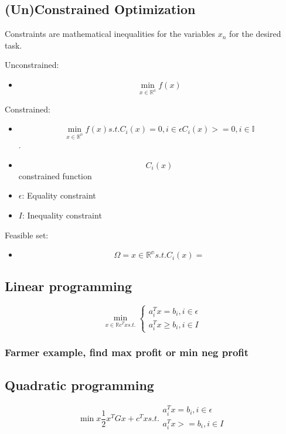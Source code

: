 \subsection{(Un)Constrained Optimization}

Constraints are mathematical inequalities for the variables $x_n$ for the desired task.

Unconstrained:
\begin{itemize}
    \item \[\min_{x \in \mathbb{R^n}} f(x)\]
\end{itemize}

Constrained:
\begin{itemize}
    \item \[\min_{x \in \mathbb{R^n}} f(x) s.t. C_i(x) = 0, i \in \mathbb{\epsilon} C_i(x)>=0, i \in \mathbb{I}\].
    \item \[C_i(x)\] constrained function
    \item $\epsilon$: Equality constraint
    \item $I$: Inequality constraint
\end{itemize}

Feasible set:
\begin{itemize}
    \item \[\Omega = {x \in \mathbb{R^n} s.t. C_i(x) = } \]
\end{itemize}

\subsection{Linear programming}
\begin{equation}
    \min_{x \in \mathbb{R} c^Tx s.t.}
        \left\{ \begin{aligned}
            a_i^T x = b_i , i \in \epsilon \\
            a_i^Tx \geq b_i, i \in I
        \end{aligned}
        \right.
\end{equation}

\subsubsection{Farmer example, find  max profit or min neg profit}

\subsection{Quadratic programming}
\begin{equation}
    \min{x \frac{1}{2}x^TGx + c^Tx s.t. \begin{aligned}
        a_i^T x = b_i , i \in \epsilon \\
        a_i^Tx >= b_i, i \in I \\
        \end{aligned}}
\end{equation}

